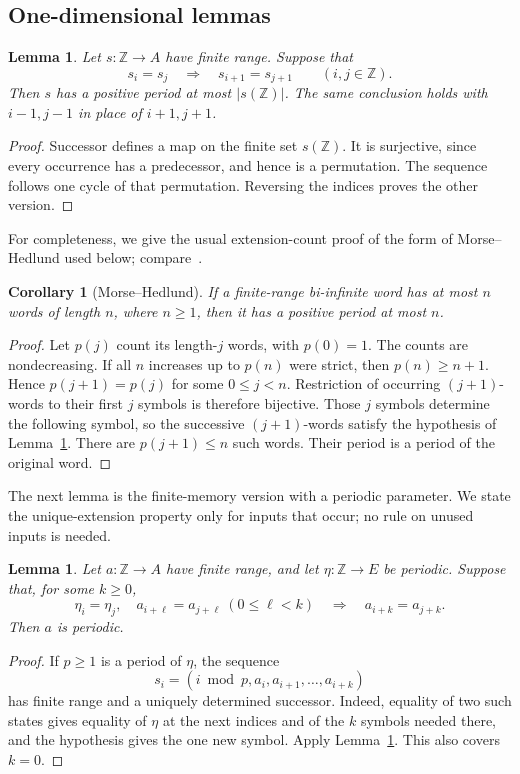 \documentclass[11pt,a4paper,reqno]{amsart}
\newtheorem{lemma}[theorem]{Lemma}
\newtheorem{corollary}[theorem]{Corollary}
\theoremstyle{remark}
\newcommand{\Z}{\mathbb Z}
\numberwithin{equation}{section}
\begin{document}
\subsection{One-dimensional lemmas}
\begin{lemma}\label{lem:finite-states}
Let $s:\Z\to A$ have finite range. Suppose that
\[
 s_i=s_j\quad\Longrightarrow\quad s_{i+1}=s_{j+1}
 \qquad(i,j\in\Z).
\]
Then $s$ has a positive period at most $|s(\Z)|$. The same conclusion holds with $i-1,j-1$ in place of $i+1,j+1$.
\end{lemma}
\begin{proof}
Successor defines a map on the finite set $s(\Z)$. It is surjective, since every occurrence has a predecessor, and hence is a permutation. The sequence follows one cycle of that permutation. Reversing the indices proves the other version.
\end{proof}

For completeness, we give the usual extension-count proof of the form of Morse--Hedlund used below; compare~\cite[Section~2.1]{CK}.

\begin{corollary}[Morse--Hedlund]\label{cor:morse}
If a finite-range bi-infinite word has at most $n$ words of length $n$, where $n\ge1$, then it has a positive period at most $n$.
\end{corollary}
\begin{proof}
Let $p(j)$ count its length-$j$ words, with $p(0)=1$. The counts are nondecreasing. If all $n$ increases up to $p(n)$ were strict, then $p(n)\ge n+1$. Hence $p(j+1)=p(j)$ for some $0\le j<n$. Restriction of occurring $(j+1)$-words to their first $j$ symbols is therefore bijective. Those $j$ symbols determine the following symbol, so the successive $(j+1)$-words satisfy the hypothesis of Lemma~\ref{lem:finite-states}. There are $p(j+1)\le n$ such words. Their period is a period of the original word.
\end{proof}

The next lemma is the finite-memory version with a periodic parameter. We state the unique-extension property only for inputs that occur; no rule on unused inputs is needed.

\begin{lemma}\label{lem:forcing}
Let $a:\Z\to A$ have finite range, and let $\eta:\Z\to E$ be periodic. Suppose that, for some $k\ge0$,
\[
 \eta_i=\eta_j,\quad a_{i+\ell}=a_{j+\ell}\ (0\le\ell<k)
 \quad\Longrightarrow\quad a_{i+k}=a_{j+k}.
\]
Then $a$ is periodic.
\end{lemma}
\begin{proof}
If $p\ge1$ is a period of $\eta$, the sequence
\[
 s_i=(i\bmod p,a_i,a_{i+1},\ldots,a_{i+k})
\]
has finite range and a uniquely determined successor. Indeed, equality of two such states gives equality of $\eta$ at the next indices and of the $k$ symbols needed there, and the hypothesis gives the one new symbol. Apply Lemma~\ref{lem:finite-states}. This also covers $k=0$.
\end{proof}
\end{document}
